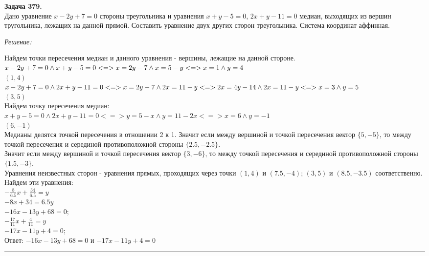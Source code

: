 \documentclass[a4paper, 12pt]{article}
\newenvironment{problem}[2][Задача]
    { \begin{mdframed}[backgroundcolor=gray!10] \textbf{#1 #2.} \\}
    {  \end{mdframed}}
\newenvironment{solution}
    {\textit{Решение: }}
    {\noindent\rule{7in}{1.5pt}}
\begin{document}
\begin{problem}{379}
Дано уравнение $x-2y+7=0$ стороны треугольника и уравнения $x+y-5=0$, $2x+y-11=0$ медиан,
выходящих из вершин тругольника, лежащих на данной прямой. Составить уравнение двух других сторон треугольника.
Система координат аффинная.
\end{problem}
\begin{solution}

Найдем точки пересечения медиан и данного уравнения - вершины, лежащие на данной стороне. \\
$x-2y+7=0 \land x+y-5=0 <=>
x=2y-7 \land x=5-y <=> \\
x = 1 \land y = 4$ \\ $(1, 4)$ \\
$x-2y+7=0 \land 2x+y-11=0 <=>
x=2y-7 \land 2x=11-y <=>
2x=4y-14 \land 2x=11-y <=> \\
x = 3 \land y = 5$ \\ $(3, 5)$ \\
Найдем точку пересечения медиан: \\
$x+y-5=0 \land 2x+y-11=0 <=> y=5-x \land y = 11-2x <=> x = 6 \land y = -1$ \\ $(6, -1)$ \\
Медианы делятся точкой пересечения в отношении 2 к 1.
Значит если между вершиной и точкой пересечения вектор $\{5, -5\}$, то между точкой пересечения и серединой противоположной стороны $\{2.5, -2.5\}$. \\
Значит если между вершиной и точкой пересечения вектор $\{3, -6\}$, то между точкой пересечения и серединой противоположной стороны $\{1.5, -3\}$. \\
Уравнения неизвестных сторон - уравнения прямых, проходящих через точки $(1, 4)$ и $(7.5, -4)$; $(3, 5)$ и $(8.5, -3.5)$ соответственно. \\
Найдем эти уравнения: \\
$-\frac{8}{6.5}x+\frac{34}{6.5}=y$ \\
$-8x+34=6.5y$ \\
$-16x - 13y +68 = 0$; \\
$-\frac{17}{11}x + \frac{4}{11} = y$ \\
$-17x - 11y + 4 = 0$; \\
Ответ: $-16x - 13y +68 = 0$ и $-17x - 11y + 4 = 0$

\end{solution}

\end{document}
